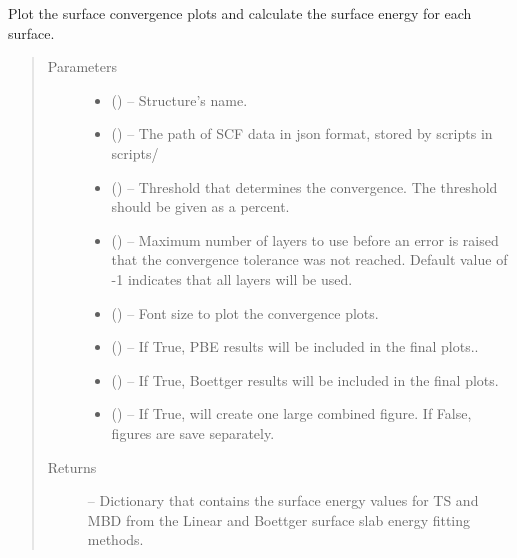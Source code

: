 \documentclass[letterpaper,10pt,english,openany,oneside]{sphinxmanual}
\begin{document}
\begin{fulllineitems}
\label{\detokenize{index:ogre.utils.convergence_plots}}
Plot the surface convergence plots and calculate the surface energy for each
surface.
\begin{quote}\begin{description}
\item[{Parameters}] \leavevmode\begin{itemize}
\item {} 
 () -- Structure's name.

\item {} 
 () -- The path of SCF data in json format, stored by scripts in scripts/

\item {} 
 () -- Threshold that determines the convergence. The threshold should be given
as a percent.

\item {} 
 () -- Maximum number of layers to use before an error is raised that the
convergence tolerance was not reached. Default value of -1 indicates
that all layers will be used.

\item {} 
 () -- Font size to plot the convergence plots.

\item {} 
 () -- If True, PBE results will be included in the final plots..

\item {} 
 () -- If True, Boettger results will be included in the final plots.

\item {} 
 () -- If True, will create one large combined figure.
If False, figures are save separately.

\end{itemize}

\item[{Returns}] \leavevmode
{} -- Dictionary that contains the surface energy values for TS and MBD from
the Linear and Boettger surface slab energy fitting methods.

\end{description}\end{quote}

\end{fulllineitems}
\end{document}
